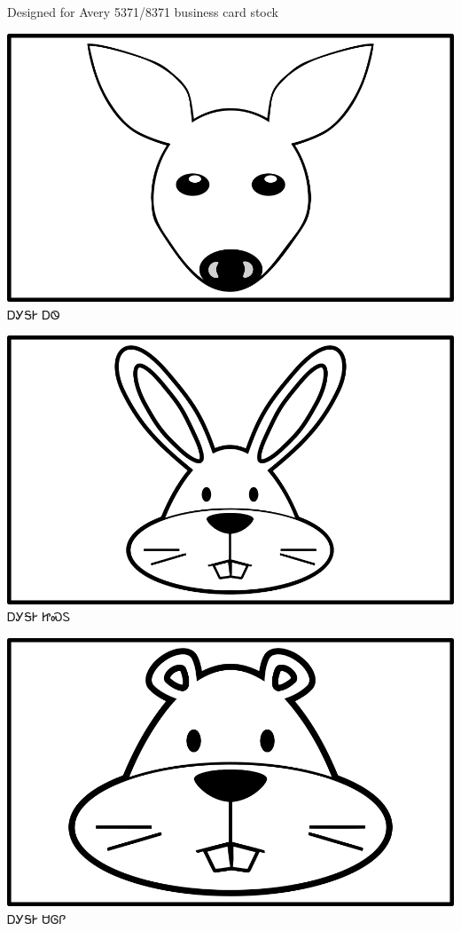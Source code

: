\documentclass[avery5371]{flashcards}%
\begin{document}
    Designed for Avery 5371/8371 business card stock

    \begin{flashcard}{
        \includegraphics[width=0.95\columnwidth,height=.51\columnwidth,keepaspectratio]{../artwork/objects-animate/ahwi}
    }
        \Huge ᎠᎩᎦᎨ ᎠᏫ
    \end{flashcard}

    \begin{flashcard}{
        \includegraphics[width=0.95\columnwidth,height=.51\columnwidth,keepaspectratio]{../artwork/objects-animate/jisdu}
    }
        \Huge ᎠᎩᎦᎨ ᏥᏍᏚ
    \end{flashcard}

    \begin{flashcard}{
        \includegraphics[width=0.95\columnwidth,height=.51\columnwidth,keepaspectratio]{../artwork/objects-animate/saloli}
    }
        \Huge ᎠᎩᎦᎨ ᏌᎶᎵ
    \end{flashcard}
\end{document}

